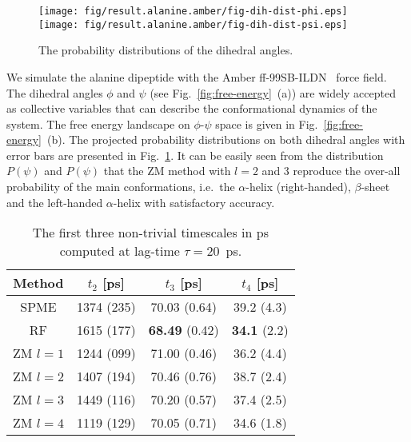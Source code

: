 \documentclass[aip,jcp,a4paper,preprint,unsortedaddress,onecolumn,fleqn]{revtex4-1}
\begin{document}
\begin{figure}
  \centering
  \texttt{[image: fig/result.alanine.amber/fig-dih-dist-phi.eps]}\\
  \texttt{[image: fig/result.alanine.amber/fig-dih-dist-psi.eps]}
  \caption{The probability distributions of the dihedral angles.}
  \label{fig:dih-dist}
\end{figure}


We simulate the alanine dipeptide with the Amber
ff-99SB-ILDN~\cite{lindorff2010improved} force field.  The dihedral
angles $\phi$ and $\psi$ (see Fig.~\ref{fig:free-energy}~(a)) are
widely accepted as collective variables that can describe the
conformational dynamics of the system.  The free energy landscape
on $\phi$-$\psi$ space is given in Fig.~\ref{fig:free-energy}~(b).  The projected
probability distributions on both dihedral angles
with error bars are presented in Fig.~\ref{fig:dih-dist}. It can be easily seen
from the distribution $P(\psi)$ and $P(\psi)$ that the ZM method with
$l=2$ and 3 reproduce the over-all probability of the main
conformations, i.e.~the $\alpha$-helix (right-handed), $\beta$-sheet and
the left-handed $\alpha$-helix with satisfactory accuracy.



\begin{table}
  \centering
  \caption{The first three non-trivial timescales in ps computed at lag-time $\tau = 20$~ps.
  }
  \begin{tabular*}{0.5\textwidth}{@{\extracolsep{\fill}}c   ccc}\hline\hline
    Method      &        $t_2$ [ps]  & $t_3$ [ps] &  $t_4$ [ps] \\\hline
    SPME        &         1374  (235)     &          70.03  (0.64)  &         39.2  (4.3)    \\
    RF          &        {1615} (177)     &  \textbf{68.49} (0.42)  & \textbf{34.1} (2.2)    \\
    ZM $l=1$    &        {1244} (099)     &         {71.00} (0.46)  &         36.2  (4.4)    \\
    ZM $l=2$    &         1407  (194)     &          70.46  (0.76)  &         38.7  (2.4)    \\
    ZM $l=3$    &         1449  (116)     &          70.20  (0.57)  &         37.4  (2.5)    \\
    ZM $l=4$    &        {1119} (129)     &          70.05  (0.71)  &         34.6  (1.8)    \\
    \hline\hline
  \end{tabular*}
  \label{tab:tmp3}
\end{table}
\end{document}
